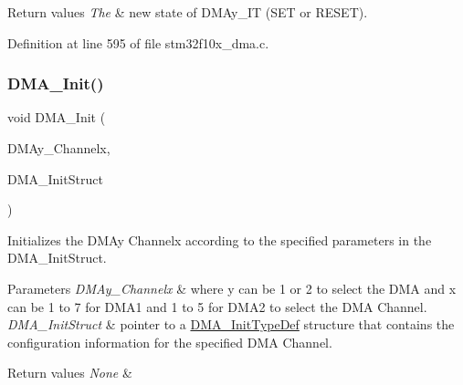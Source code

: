 \begin{DoxyRetVals}{Return values}
{\em The} & new state of D\+M\+Ay\+\_\+\+IT (S\+ET or R\+E\+S\+ET). \\
\hline
\end{DoxyRetVals}


Definition at line 595 of file stm32f10x\+\_\+dma.\+c.

\mbox{\label{group___d_m_a___exported___functions_ga7c3d1b9dc041f8e5f2cfc8d5dd858278}} 
\subsubsection{\texorpdfstring{D\+M\+A\+\_\+\+Init()}{DMA\_Init()}}
{\footnotesize\ttfamily void D\+M\+A\+\_\+\+Init (\begin{DoxyParamCaption}\item[{\hyperlink{struct_d_m_a___channel___type_def}{D\+M\+A\+\_\+\+Channel\+\_\+\+Type\+Def} $\ast$}]{D\+M\+Ay\+\_\+\+Channelx,  }\item[{\hyperlink{struct_d_m_a___init_type_def}{D\+M\+A\+\_\+\+Init\+Type\+Def} $\ast$}]{D\+M\+A\+\_\+\+Init\+Struct }\end{DoxyParamCaption})}



Initializes the D\+M\+Ay Channelx according to the specified parameters in the D\+M\+A\+\_\+\+Init\+Struct. 


\begin{DoxyParams}{Parameters}
{\em D\+M\+Ay\+\_\+\+Channelx} & where y can be 1 or 2 to select the D\+MA and x can be 1 to 7 for D\+M\+A1 and 1 to 5 for D\+M\+A2 to select the D\+MA Channel. \\
\hline
{\em D\+M\+A\+\_\+\+Init\+Struct} & pointer to a \hyperlink{struct_d_m_a___init_type_def}{D\+M\+A\+\_\+\+Init\+Type\+Def} structure that contains the configuration information for the specified D\+MA Channel. \\
\hline
\end{DoxyParams}

\begin{DoxyRetVals}{Return values}
{\em None} & \\
\hline
\end{DoxyRetVals}


